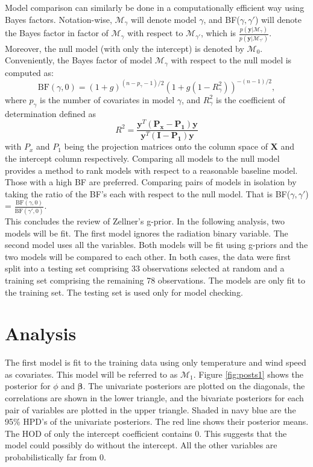 \documentclass{../../tex_template/asaproc}
\newcommand{\y}{\bm y}
\newcommand{\X}{\bm X}
\newcommand{\M}{\mathcal{M}}
\begin{document}
Model comparison can similarly be done in a computationally efficient way using
Bayes factors. Notation-wise, $\M_\gamma$ will denote model $\gamma$, and
BF($\gamma,\gamma'$) will denote the Bayes factor in factor of $\M_\gamma$ with
respect to $\M_{\gamma'}$, which is
$\frac{p(\y|\M_\gamma)}{p(\y|\M_{\gamma'})}$. Moreover,
the null model (with only the intercept) is denoted by $\M_{0}$. Conveniently,
the Bayes factor of model $\M_\gamma$ with respect to the null model is
computed as: \\
\[
  \text{BF}(\gamma,0) = (1+g)^{(n-p_\gamma-1)/2} (1+g(1-R^2_\gamma))^{-(n-1)/2},
\]
where $p_\gamma$ is the number of covariates in model $\gamma$, and $R^2_\gamma$
is the coefficient of determination defined as 
\[
  R^2 = \frac{\y^T(\bm {P_x-P_1})\y}{\y^T(\bm {I-P_1})\y}
\]
with $P_x$ and $P_1$ being the projection matrices onto the column space
of $\X$ and the intercept column respectively. Comparing all models
to the null model provides a method to rank models with respect to a 
reasonable baseline model. Those with a high BF are preferred. Comparing 
pairs of models in isolation by taking the ratio of the BF's each
with respect to the null model. That is BF($\gamma,\gamma'$) = 
$\frac{\text{BF}(\gamma,0)}{\text{BF}(\gamma',0)}$.\\

This concludes the review of Zellner's g-prior. In the following 
analysis, two models will be fit. The first model ignores the radiation
binary variable. The second model uses all the variables. Both models
will be fit using g-priors and the two models will be compared to
each other. In both cases, the data were first split into a testing
set comprising 33 observations selected at random and a training 
set comprising the remaining 78 observations. The models are
only fit to the training set. The testing set is used only for
model checking.

\section{Analysis}
The first model is fit to the training data using only temperature and wind
speed as covariates. This model will be referred to as $\M_1$. Figure 
\ref{fig:posts1} shows the posterior for $\phi$ and $\bm\beta$.
The univariate posteriors are plotted on the diagonals, the correlations
are shown in the lower triangle, and the bivariate posteriors for each 
pair of variables are plotted in the upper triangle.
Shaded in navy blue are the 95\% HPD's of the univariate posteriors.
The red line shows their posterior means. The HOD of only the intercept
coefficient contains 0. This suggests that the model could possibly
do without the intercept. All the other variables are probabilistically
far from 0. \\
\end{document}
